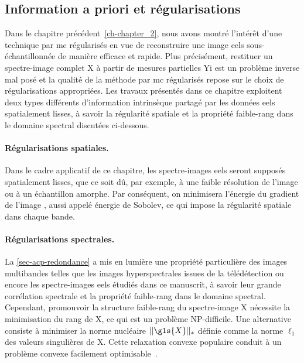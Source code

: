 \subsection{Information a priori et régularisations}\label{subsec-BR-reguls}

Dans le chapitre précédent~\ref{ch-chapter_2}, nous avons montré l'intérêt d'une technique par \gls{mc} régularisés en vue de reconstruire une image \gls{eels} sous-échantillonnée de manière efficace et rapide. Plus précisément, restituer un spectre-image complet \gls{X} à partir de mesures partielles \gls{Yi} est un problème inverse mal posé et la qualité de la méthode par \gls{mc} régularisés repose sur le choix de régularisations appropriées.
%
Les travaux présentés dans ce chapitre exploitent deux types différents d'information intrinsèque partagé par les données \gls{eels} spatialement lisses, à savoir la régularité spatiale et la propriété faible-rang dans le domaine spectral discutées ci-dessous.

\paragraph{Régularisations spatiales.} Dans le cadre applicatif de ce chapitre, les spectre-images \gls{eels} seront supposés spatialement lisses, que ce soit dû, par exemple, à une faible résolution de l'image ou à un échantillon amorphe. Par conséquent, on minimisera l'énergie du gradient de l'image , aussi appelé énergie de Sobolev, ce qui impose la régularité spatiale dans chaque bande.

\paragraph{Régularisations spectrales.} La \cref{sec-acp-redondance} a mis en lumière une propriété particulière des images multibandes telles que les images hyperspectrales issues de la télédétection ou encore les spectre-images \gls{eels} étudiés dans ce manuscrit, à savoir leur grande corrélation spectrale et la propriété faible-rang dans le domaine spectral. Cependant, promouvoir la structure faible-rang du spectre-image \gls{X} nécessite la minimisation du rang de \gls{X}, ce qui est un problème NP-difficile. Une alternative consiste à minimiser la norme nucléaire $||\gls{X}||_*$ définie comme la norme $\ell_1$ des valeurs singulières de \gls{X}. Cette relaxation convexe populaire conduit à un problème convexe facilement optimisable~\cite{recht2010guaranteed}.

